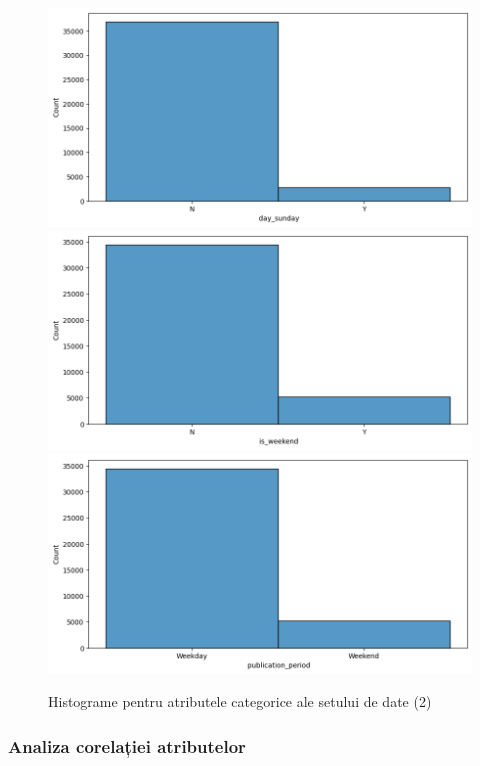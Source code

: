 \documentclass{article}
\begin{document}
\begin{figure}[htb]
    \includegraphics[scale=0.33]{news_popularity/analysis/categorical/day_sunday.png}
    \includegraphics[scale=0.33]{news_popularity/analysis/categorical/is_weekend.png}
    \includegraphics[scale=0.33]{news_popularity/analysis/categorical/publication_period.png}
    \caption{Histograme pentru atributele categorice ale setului de date (2)}
    \label{fig:news:cat_hists2}
\end{figure}
 

\subsubsection{Analiza corelației atributelor}
\end{document}
